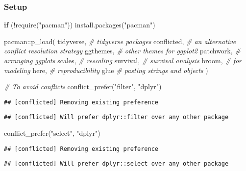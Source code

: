 \documentclass[
]{book}
\newenvironment{Shaded}{\begin{snugshade}}{\end{snugshade}}
\newcommand{\CommentTok}[1]{\textcolor[rgb]{0.56,0.35,0.01}{\textit{#1}}}
\newcommand{\ControlFlowTok}[1]{\textcolor[rgb]{0.13,0.29,0.53}{\textbf{#1}}}
\newcommand{\FunctionTok}[1]{\textcolor[rgb]{0.00,0.00,0.00}{#1}}
\newcommand{\NormalTok}[1]{#1}
\newcommand{\SpecialCharTok}[1]{\textcolor[rgb]{0.00,0.00,0.00}{#1}}
\newcommand{\StringTok}[1]{\textcolor[rgb]{0.31,0.60,0.02}{#1}}
\begin{document}
\hypertarget{setup-7}{%
\subsubsection{Setup}\label{setup-7}}

\begin{Shaded}
\begin{Highlighting}[]
\ControlFlowTok{if}\NormalTok{ (}\SpecialCharTok{!}\FunctionTok{require}\NormalTok{(}\StringTok{"pacman"}\NormalTok{)) }\FunctionTok{install.packages}\NormalTok{(}\StringTok{"pacman"}\NormalTok{)}

\NormalTok{pacman}\SpecialCharTok{::}\FunctionTok{p\_load}\NormalTok{(}
\NormalTok{ tidyverse, }\CommentTok{\# tidyverse packages }
\NormalTok{ conflicted, }\CommentTok{\# an alternative conflict resolution strategy }
\NormalTok{ ggthemes, }\CommentTok{\# other themes for ggplot2 }
\NormalTok{ patchwork, }\CommentTok{\# arranging ggplots}
\NormalTok{ scales, }\CommentTok{\# rescaling }
\NormalTok{ survival, }\CommentTok{\# survival analysis}
\NormalTok{ broom, }\CommentTok{\# for modeling}
\NormalTok{ here, }\CommentTok{\# reproducibility }
\NormalTok{ glue }\CommentTok{\# pasting strings and objects }
\NormalTok{)}

\CommentTok{\# To avoid conflicts }
\FunctionTok{conflict\_prefer}\NormalTok{(}\StringTok{"filter"}\NormalTok{, }\StringTok{"dplyr"}\NormalTok{) }
\end{Highlighting}
\end{Shaded}

\begin{verbatim}
## [conflicted] Removing existing preference
\end{verbatim}

\begin{verbatim}
## [conflicted] Will prefer dplyr::filter over any other package
\end{verbatim}

\begin{Shaded}
\begin{Highlighting}[]
\FunctionTok{conflict\_prefer}\NormalTok{(}\StringTok{"select"}\NormalTok{, }\StringTok{"dplyr"}\NormalTok{) }
\end{Highlighting}
\end{Shaded}

\begin{verbatim}
## [conflicted] Removing existing preference
\end{verbatim}

\begin{verbatim}
## [conflicted] Will prefer dplyr::select over any other package
\end{verbatim}
\end{document}
